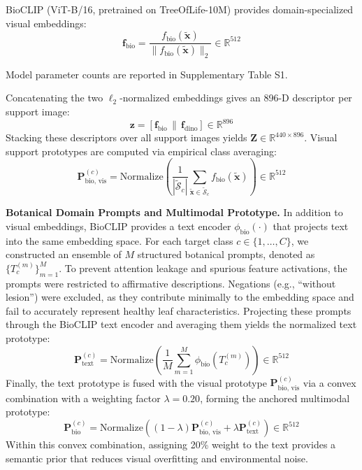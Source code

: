 \documentclass[conference]{IEEEtran}
\begin{document}
BioCLIP (ViT-B/16, pretrained on TreeOfLife-10M) \cite{stevens2024bioclip} provides domain-specialized visual embeddings:
\begin{equation}
    \mathbf{f}_{\text{bio}} = \frac{f_{\text{bio}}(\tilde{\mathbf{x}})}{\|f_{\text{bio}}(\tilde{\mathbf{x}})\|_2} \in \mathbb{R}^{512}
\end{equation}

Model parameter counts are reported in Supplementary Table S1.

Concatenating the two $\ell_2$-normalized embeddings gives an 896-D descriptor per support image:
\begin{equation}
    \mathbf{z} = \left[\mathbf{f}_{\text{bio}} \,\|\, \mathbf{f}_{\text{dino}}\right] \in \mathbb{R}^{896}
\end{equation}
Stacking these descriptors over all support images yields $\mathbf{Z} \in \mathbb{R}^{440 \times 896}$. Visual support prototypes are computed via empirical class averaging:
\begin{equation}
    \mathbf{P}_{\text{bio, vis}}^{(c)} = \text{Normalize}\left(\frac{1}{|\tilde{\mathcal{S}}_c|}\sum_{\tilde{\mathbf{x}} \in \tilde{\mathcal{S}}_c} f_{\text{bio}}(\tilde{\mathbf{x}})\right) \in \mathbb{R}^{512}
\end{equation}

\textbf{Botanical Domain Prompts and Multimodal Prototype.} In addition to visual embeddings, BioCLIP provides a text encoder $\phi_{\text{bio}}(\cdot)$ that projects text into the same embedding space. For each target class $c \in \{1, \dots, C\}$, we constructed an ensemble of $M$ structured botanical prompts, denoted as $\{T_c^{(m)}\}_{m=1}^M$. To prevent attention leakage and spurious feature activations, the prompts were restricted to affirmative descriptions. Negations (e.g., ``without lesion'') were excluded, as they contribute minimally to the embedding space and fail to accurately represent healthy leaf characteristics. Projecting these prompts through the BioCLIP text encoder and averaging them yields the normalized text prototype:
\begin{equation}
    \mathbf{P}_{\text{text}}^{(c)} = \text{Normalize}\left(\frac{1}{M}\sum_{m=1}^M \phi_{\text{bio}}(T_c^{(m)})\right) \in \mathbb{R}^{512}
\end{equation}
Finally, the text prototype is fused with the visual prototype $\mathbf{P}_{\text{bio, vis}}^{(c)}$ via a convex combination with a weighting factor $\lambda = 0.20$, forming the anchored multimodal prototype:
\begin{equation}
    \mathbf{P}_{\text{bio}}^{(c)} = \text{Normalize}\left((1-\lambda)\mathbf{P}_{\text{bio, vis}}^{(c)} + \lambda \mathbf{P}_{\text{text}}^{(c)}\right) \in \mathbb{R}^{512}
\end{equation}
Within this convex combination, assigning 20\% weight to the text provides a semantic prior that reduces visual overfitting and environmental noise.
\end{document}
